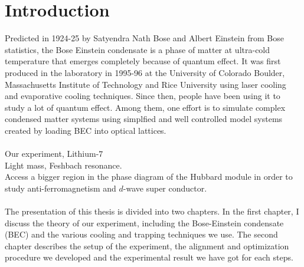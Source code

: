 \chapter*{Introduction}

Predicted in 1924-25 by Satyendra Nath Bose and Albert Einstein from Bose statistics, the Bose Einstein condensate is a phase of matter at ultra-cold temperature that emerges completely because of quantum effect. It was first produced in the laboratory in 1995-96 at the University of Colorado Boulder, Massachusetts Institute of Technology and Rice University using laser cooling and evaporative cooling techniques. Since then, people have been using it to study a lot of quantum effect. Among them, one effort is to simulate complex condensed matter systems using simplfied and well controlled model systems created by loading BEC into optical lattices.\\
\\
Our experiment, Lithium-$7$\\
Light mass, Feshbach resonance.\\
Access a bigger region in the phase diagram of the Hubbard module in order to study anti-ferromagnetism and $d$-wave super conductor.\\
\\
The presentation of this thesis is divided into two chapters. In the first chapter, I discuss the theory of our experiment, including the Bose-Einstein condensate (BEC) and the various cooling and trapping techniques we use. The second chapter describes the setup of the experiment, the alignment and optimization procedure we developed and the experimental result we have got for each steps.
